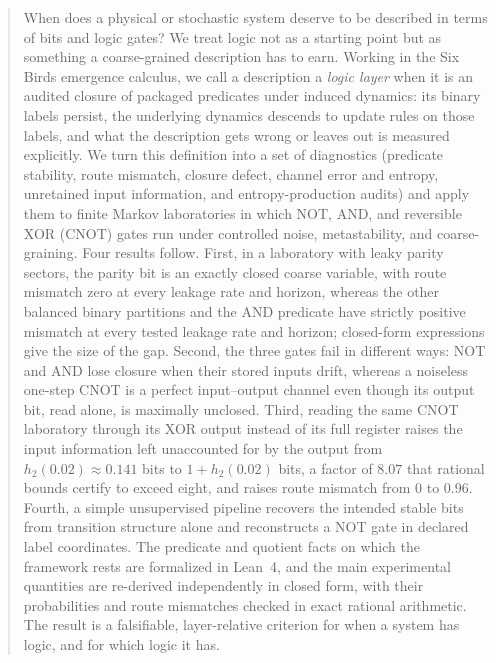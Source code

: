 \maketitle
\thispagestyle{firstpage}

\begin{abstract}
When does a physical or stochastic system deserve to be described in terms of bits and logic gates? We treat logic not as a starting point but as something a coarse-grained description has to earn. Working in the Six Birds emergence calculus, we call a description a \emph{logic layer} when it is an audited closure of packaged predicates under induced dynamics: its binary labels persist, the underlying dynamics descends to update rules on those labels, and what the description gets wrong or leaves out is measured explicitly. We turn this definition into a set of diagnostics (predicate stability, route mismatch, closure defect, channel error and entropy, unretained input information, and entropy-production audits) and apply them to finite Markov laboratories in which NOT, AND, and reversible XOR (CNOT) gates run under controlled noise, metastability, and coarse-graining. Four results follow. First, in a laboratory with leaky parity sectors, the parity bit is an exactly closed coarse variable, with route mismatch zero at every leakage rate and horizon, whereas the other balanced binary partitions and the AND predicate have strictly positive mismatch at every tested leakage rate and horizon; closed-form expressions give the size of the gap. Second, the three gates fail in different ways: NOT and AND lose closure when their stored inputs drift, whereas a noiseless one-step CNOT is a perfect input--output channel even though its output bit, read alone, is maximally unclosed. Third, reading the same CNOT laboratory through its XOR output instead of its full register raises the input information left unaccounted for by the output from \(h_2(0.02)\approx 0.141\) bits to \(1+h_2(0.02)\) bits, a factor of \(8.07\) that rational bounds certify to exceed eight, and raises route mismatch from \(0\) to \(0.96\). Fourth, a simple unsupervised pipeline recovers the intended stable bits from transition structure alone and reconstructs a NOT gate in declared label coordinates. The predicate and quotient facts on which the framework rests are formalized in Lean~4, and the main experimental quantities are re-derived independently in closed form, with their probabilities and route mismatches checked in exact rational arithmetic. The result is a falsifiable, layer-relative criterion for when a system has logic, and for which logic it has.
\end{abstract}

